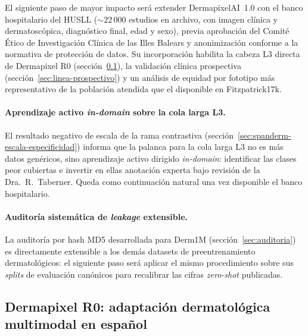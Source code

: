 El siguiente paso de mayor impacto será extender DermapixelAI~1.0 con el
banco hospitalario del HUSLL ($\sim 22\,000$ estudios en archivo, con
imagen clínica y dermatoscópica, diagnóstico final, edad y sexo), previa
aprobación del Comité Ético de Investigación Clínica de las Illes Balears
y anonimización conforme a la normativa de protección de datos. Su
incorporación habilita la cabeza L3 directa de Dermapixel R0
(sección~\ref{sec:linea-spanderm}), la validación clínica prospectiva
(sección~\ref{sec:linea-prospectivo}) y un análisis de equidad por
fototipo más representativo de la población atendida que el disponible en
Fitzpatrick17k.

\paragraph{Aprendizaje activo \emph{in-domain} sobre la cola larga L3.}
\label{sec:linea-active-learning}
El resultado negativo de escala de la rama contrastiva
(sección~\ref{sec:spanderm-escala-especificidad}) informa que la palanca
para la cola larga L3 no es más datos genéricos, sino aprendizaje activo
dirigido \emph{in-domain}: identificar las clases peor cubiertas e
invertir en ellas anotación experta bajo revisión de la
Dra.~R.~Taberner. Queda como continuación natural una vez disponible el
banco hospitalario.

\paragraph{Auditoría sistemática de \emph{leakage} extensible.}
\label{sec:linea-leakage}
La auditoría por hash MD5 desarrollada para Derm1M
(sección~\ref{sec:auditoria}) es directamente extensible a los demás
datasets de preentrenamiento dermatológicos: el siguiente paso será
aplicar el mismo procedimiento sobre sus \emph{splits} de evaluación
canónicos para recalibrar las cifras \emph{zero-shot} publicadas.

\subsection{Dermapixel R0: adaptación dermatológica multimodal en
español}
\label{sec:linea-spanderm}

